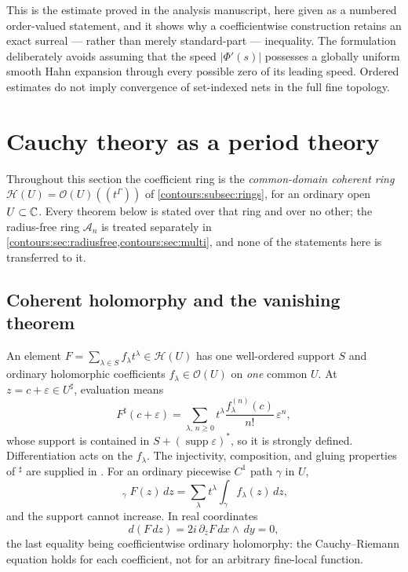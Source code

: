 \documentclass[11pt,letterpaper]{article}
\theoremstyle{definition}
\theoremstyle{remark}
\newcommand{\HH}{\mathcal H}\newcommand{\A}{\mathscr A}\newcommand{\OO}{\mathcal O}
\newcommand{\supp}{\operatorname{supp}}\newcommand{\Res}{\operatorname{Res}}
\newcommand{\HInt}{\mathop{\int^{\!H}}\nolimits}
\newcommand{\sh}{^{\sharp}}\newcommand{\dd}{\,d}
\numberwithin{equation}{section}
\begin{document}
This is the estimate proved in the analysis manuscript, here given as a numbered
order-valued statement, and it shows why a coefficientwise construction retains an
exact surreal --- rather than merely standard-part --- inequality. The formulation
deliberately avoids assuming that the speed $|\Phi'(s)|$ possesses a globally
uniform smooth Hahn expansion through every possible zero of its leading speed.
Ordered estimates do not imply convergence of set-indexed nets in the full fine
topology.

\section{Cauchy theory as a period theory}
\label{contours:sec:cauchy}

Throughout this section the coefficient ring is the \emph{common-domain coherent
ring} $\HH(U)=\OO(U)((t^\Gamma))$ of \cref{contours:subsec:rings}, for an ordinary
open $U\subset\mathbb C$. Every theorem below is stated over that ring and over no other;
the radius-free ring $\A_n$ is treated separately in
\cref{contours:sec:radiusfree,contours:sec:multi}, and none of the statements here
is transferred to it.

\subsection{Coherent holomorphy and the vanishing theorem}
An element $F=\sum_{\lambda\in S}f_\lambda t^\lambda\in\HH(U)$ has one well-ordered
support $S$ and ordinary holomorphic coefficients $f_\lambda\in\OO(U)$ on
\emph{one} common $U$. At $z=c+\varepsilon\in U\sh$, evaluation means
\begin{equation}\label{contours:eq:coherentevaluation}
  F\sh(c+\varepsilon)
  =\sum_{\lambda,\,n\ge0}t^\lambda
   \frac{f_\lambda^{(n)}(c)}{n!}\,\varepsilon^n ,
\end{equation}
whose support is contained in $S+(\supp\varepsilon)^*$, so it is strongly defined.
Differentiation acts on the $f_\lambda$. The injectivity, composition, and gluing
properties of $\sh$ are supplied in \cite[\S5]{Analysis}. For an ordinary piecewise
$C^1$ path $\gamma$ in $U$,
\begin{equation}\label{contours:eq:Hintegral}
  \HInt_\gamma F(z)\dd z=\sum_\lambda t^\lambda\int_\gamma f_\lambda(z)\dd z ,
\end{equation}
and the support cannot increase. In real coordinates
\begin{equation}\label{contours:eq:dFdz}
  d(F\dd z)=2i\,\partial_{\bar z}F\dd x\wedge \dd y=0 ,
\end{equation}
the last equality being coefficientwise ordinary holomorphy: the Cauchy--Riemann
equation holds for each coefficient, not for an arbitrary fine-local function.
\end{document}
